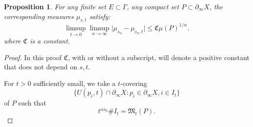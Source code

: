 \documentclass[12pt]{amsbook}%
\newtheorem{prop}[thm]{Proposition}
\theoremstyle{definition}
\theoremstyle{remark}
\numberwithin{section}{chapter}
\numberwithin{subsection}{section}
\numberwithin{figure}{chapter}
\def\dyl{>0}
\def\fC{{\mathfrak{C}}}
\def\fM{{\mathfrak{M}}}
\def\al{\alpha}
\def\geo{\partial_\infty}
\begin{document}
{{\begin{prop}\label{prop:estimate_mus_must}
For any finite set $E\subset \Gamma$, any compact set $P\subset \geo X$, the corresponding measures $\mu_{s,t}$ satisfy:
\begin{equation}\label{eq:double_limit_mus_must}
\limsup_{t\rightarrow 0}\limsup_{n\rightarrow \infty}\vert \mu_{s_n}-\mu_{s_n,t}\vert \leqslant \mathfrak{C}\mu\left(P\right)^{1/\al}.
\end{equation} 
where $\fC$ is a constant. 
\end{prop}

\begin{proof}
In this proof $\fC$, with or without a subscript, will denote a positive constant that does not depend on $s,t$.

For $t\dyl$ sufficiently small, we take a $t$-covering 
\[
\{U(p_i,t)\cap \geo X: p_i\in \geo X, i\in I_t\}
\]
of $P$ such that 
\begin{equation}\label{eq:must_box1}
t^{\alpha s_0}\#I_t = \fM_{t}(P).
\end{equation}


\end{proof}}}
\end{document}

